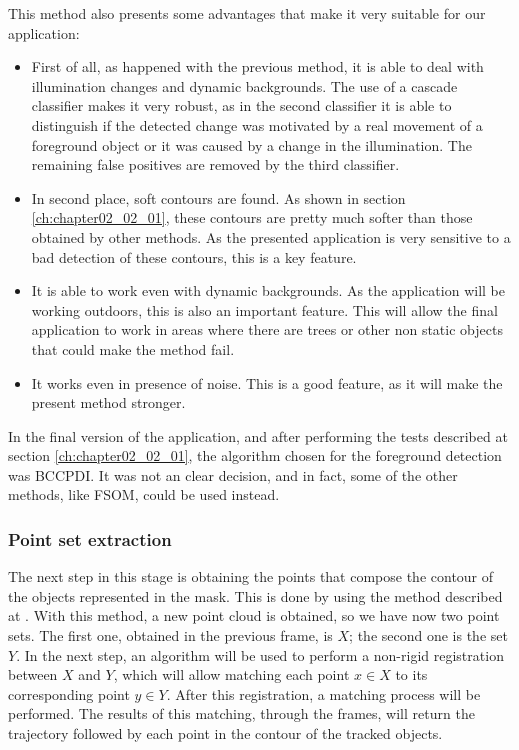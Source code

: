 \begin{itemize}
This method also presents some advantages that make it very suitable for our application:
\begin{itemize}
 \item First of all, as happened with the previous method, it is able to deal with illumination changes and dynamic backgrounds. The use of a cascade classifier makes it very robust, as in the second classifier it is able to distinguish if the detected change was motivated by a real movement of a foreground object or it was caused by a change in the illumination. The remaining false positives are removed by the third classifier.
 \item In second place, soft contours are found. As shown in section \ref{ch:chapter02_02_01}, these contours are pretty much softer than those obtained by other methods. As the presented application is very sensitive to a bad detection of these contours, this is a key feature.
 \item It is able to work even with dynamic backgrounds. As the application will be working outdoors, this is also an important feature. This will allow the final application to work in areas where there are trees or other non static objects that could make the method fail.
 \item It works even in presence of noise. This is a good feature, as it will make the present method stronger.
\end{itemize}
 
\end{itemize}

In the final version of the application, and after performing the tests described at section 
\ref{ch:chapter02_02_01}, the algorithm chosen for the foreground detection was BCCPDI. It was not an 
clear decision, and in fact, some of the other methods, like FSOM, could be used instead.

\subsubsection{Point set extraction}\label{ch:chapter02_01_01_02}

The next step in this stage is obtaining the points that compose the contour of the objects represented in the mask. This is done by using the method described at \cite{suzuki1985topological}. With this method, a new point cloud is obtained, so we have now two point sets. The first one, obtained in the previous frame, is $X$; the second one is the set $Y$. In the next step, an algorithm will be used to perform a non-rigid registration between $X$ and $Y$, which will allow matching each point $x \in X$ to its corresponding point $y \in Y$. After this registration, a matching process will be performed. The results of this matching, through the frames, will return the trajectory followed by each point in the contour of the tracked objects.

